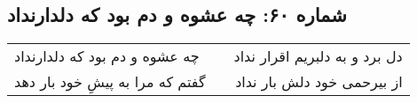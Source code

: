 \begin{center}
\section*{شماره ۶۰: چه عشوه و دم بود که دلدارنداد}
\label{sec:060}
\begin{longtable}{l p{0.5cm} r}
چه عشوه و دم بود که دلدارنداد
&&
دل برد و به دلبریم اقرار نداد
\\
گفتم که مرا به پیشِ خود بار دهد
&&
از بیرحمی خود دلش بار نداد
\\
\end{longtable}
\end{center}
